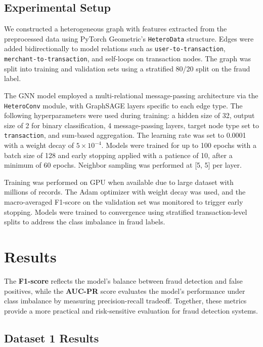 \documentclass[conference]{IEEEtran}
\begin{document}
\subsection{Experimental Setup}

We constructed a heterogeneous graph with features extracted from the preprocessed data using PyTorch Geometric’s \texttt{HeteroData} structure. Edges were added bidirectionally to model relations such as \texttt{user-to-transaction}, \texttt{merchant-to-transaction}, and self-loops on transaction nodes. The graph was split into training and validation sets using a stratified 80/20 split on the fraud label.

The GNN model employed a multi-relational message-passing architecture via the \texttt{HeteroConv} module, with GraphSAGE layers specific to each edge type. The following hyperparameters were used during training: a hidden size of 32, output size of 2 for binary classification, 4 message-passing layers, target node type set to \texttt{transaction}, and sum-based aggregation. The learning rate was set to 0.0001 with a weight decay of $5 \times 10^{-4}$. Models were trained for up to 100 epochs with a batch size of 128 and early stopping applied with a patience of 10, after a minimum of 60 epochs. Neighbor sampling was performed at [5, 5] per layer.

Training was performed on GPU when available due to large dataset with millions of records. The Adam optimizer with weight decay was used, and the macro-averaged F1-score on the validation set was monitored to trigger early stopping. Models were trained to convergence using stratified transaction-level splits to address the class imbalance in fraud labels.


\section{Results}

The \textbf{F1-score} reflects the model’s balance between fraud detection and false positives, while the \textbf{AUC-PR} score evaluates the model’s performance under class imbalance by measuring precision-recall tradeoff. Together, these metrics provide a more practical and risk-sensitive evaluation for fraud detection systems.

\subsection{Dataset 1 Results}
\end{document}
